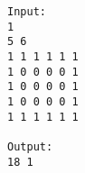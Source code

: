 \begin{verbatim}
Input:
1
5 6
1 1 1 1 1 1
1 0 0 0 0 1
1 0 0 0 0 1
1 0 0 0 0 1
1 1 1 1 1 1

Output:
18 1
\end{verbatim}